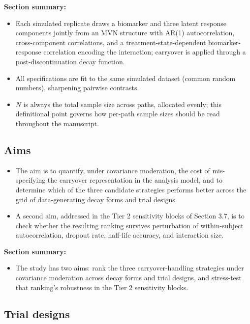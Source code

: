 \documentclass[
  11pt,
]{article}
\providecommand{\tightlist}{%
  \setlength{\itemsep}{0pt}\setlength{\parskip}{0pt}}
\begin{document}
\textbf{Section summary:}

\begin{itemize}
\tightlist
\item
  Each simulated replicate draws a biomarker and three latent
  response components jointly from an MVN structure with AR(1)
  autocorrelation, cross-component correlations, and a
  treatment-state-dependent biomarker-response correlation encoding
  the interaction; carryover is applied through a post-discontinuation
  decay function.
\item
  All specifications are fit to the same simulated dataset (common
  random numbers), sharpening pairwise contrasts.
\item
  \(N\) is always the total sample size across paths, allocated evenly;
  this definitional point governs how per-path sample sizes should be
  read throughout the manuscript.
\end{itemize}

\subsection{Aims}\label{aims}

\begin{itemize}
\tightlist
\item
  The aim is to quantify, under covariance moderation, the cost of
  mis-specifying the carryover representation in the analysis model,
  and to determine which of the three candidate strategies performs
  better across the grid of data-generating decay forms and trial
  designs.
\item
  A second aim, addressed in the Tier 2 sensitivity blocks of Section
  3.7, is to check whether the resulting ranking survives perturbation
  of within-subject autocorrelation, dropout rate, half-life
  accuracy, and interaction size.
\end{itemize}

\textbf{Section summary:}

\begin{itemize}
\tightlist
\item
  The study has two aims: rank the three carryover-handling
  strategies under covariance moderation across decay forms and trial
  designs, and stress-test that ranking's robustness in the Tier 2
  sensitivity blocks.
\end{itemize}

\subsection{Trial designs}\label{trial-designs}
\end{document}
